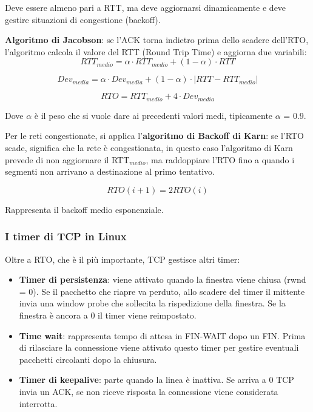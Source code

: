             Deve essere almeno pari a RTT, ma deve aggiornarsi dinamicamente e deve gestire situazioni di congestione (backoff).
        
            \textbf{Algoritmo di Jacobson}: se l'ACK torna indietro prima dello scadere dell'RTO, l'algoritmo calcola il valore del RTT (Round Trip Time) e aggiorna due variabili:
            \begin{equation*}
                RTT_{medio} = \alpha \cdot RTT_{medio} + (1 - \alpha) \cdot RTT
            \end{equation*}

            \begin{equation*}
                Dev_{media} = \alpha \cdot Dev_{media} + (1 - \alpha) \cdot |RTT - RTT_{medio}|
            \end{equation*}

            \begin{equation*}
                RTO = RTT_{medio} + 4 \cdot Dev_{media}
            \end{equation*}

            Dove $\alpha$ è il peso che si vuole dare ai precedenti valori medi, tipicamente $\alpha$ = 0.9.

            Per le reti congestionate, si applica l'\textbf{algoritmo di Backoff di Karn}: se l'RTO scade, significa che la rete è congestionata, in questo caso l'algoritmo di Karn prevede di non aggiornare il RTT$_{medio}$, ma raddoppiare l'RTO fino a quando i segmenti non arrivano a destinazione al primo tentativo.

            \begin{equation*}
                RTO(i + 1) = 2RTO(i)
            \end{equation*}

            Rappresenta il backoff medio esponenziale.

        \subsubsection{I timer di TCP in Linux}
            Oltre a RTO, che è il più importante, TCP gestisce altri timer:
            \begin{itemize}
                \item \textbf{Timer di persistenza}: viene attivato quando la finestra viene chiusa (rwnd = 0). Se il pacchetto che riapre va perduto, allo scadere del timer il mittente invia una window probe che sollecita la rispedizione della finestra. Se la finestra è ancora a 0 il timer viene reimpostato.
                \item \textbf{Time wait}: rappresenta tempo di attesa in FIN-WAIT dopo un FIN. Prima di rilasciare la connessione viene attivato questo timer per gestire eventuali pacchetti circolanti dopo la chiusura.
                \item \textbf{Timer di keepalive}: parte quando la linea è inattiva. Se arriva a 0 TCP invia un ACK, se non riceve risposta la connessione viene considerata interrotta.
            \end{itemize}

